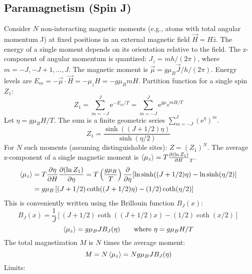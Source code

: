 \documentclass[10pt, letterpaper]{article}
\renewcommand{\hbar}{h/(2\pi)} %
\newcommand{\avg}[1]{\expval{#1}} %
\newcommand{\mathe}{\mathrm{e}} %
\begin{document}
\subsection{Paramagnetism (Spin J)}
Consider $N$ non-interacting magnetic moments (e.g., atoms with total angular momentum J) at fixed positions in an external magnetic field $\vec{H} = H \hat{z}$.
The energy of a single moment depends on its orientation relative to the field. The z-component of angular momentum is quantized: $J_z = m \hbar$, where $m = -J, -J+1, \dots, J$. The magnetic moment is $\vec{\mu} = g \mu_B \vec{J}/\hbar$. Energy levels are $E_m = - \vec{\mu} \cdot \vec{H} = - \mu_z H = - g \mu_B m H$.
Partition function for a single spin $Z_1$:
\begin{equation*}
    Z_1 = \sum_{m=-J}^{J} \mathe^{-E_m / T} = \sum_{m=-J}^{J} \mathe^{g \mu_B m H / T}
\end{equation*}
Let $\eta = g \mu_B H / T$. The sum is a finite geometric series $\sum_{m=-J}^{J} (\mathe^{\eta})^m$.
\begin{equation}
    Z_1 = \frac{\sinh((J+1/2)\eta)}{\sinh(\eta/2)}
\end{equation}
For $N$ such moments (assuming distinguishable sites): $Z = (Z_1)^N$.
The average z-component of a single magnetic moment is $\avg{\mu_z} = T \pdv{(\ln Z_1)}{H}_T$.
\begin{align*}
    \avg{\mu_z} &= T \pdv{\eta}{H} \pdv{(\ln Z_1)}{\eta} = T \left(\frac{g \mu_B}{T}\right) \pdv{}{\eta} [\ln \sinh((J+1/2)\eta) - \ln \sinh(\eta/2)] \\
                &= g \mu_B \left[ (J+1/2) \coth((J+1/2)\eta) - (1/2) \coth(\eta/2) \right]
\end{align*}
This is conveniently written using the Brillouin function $B_J(x)$:
\begin{equation}
    B_J(x) = \frac{1}{J} \left[ (J+1/2) \coth((J+1/2)x) - (1/2) \coth(x/2) \right]
\end{equation}
\begin{equation}
    \avg{\mu_z} = g \mu_B J B_J(\eta) \qquad \text{where } \eta = g \mu_B H / T
\end{equation}
The total magnetization $M$ is $N$ times the average moment:
\begin{equation}
    M = N \avg{\mu_z} = N g \mu_B J B_J(\eta)
\end{equation}
Limits:
\end{document}

